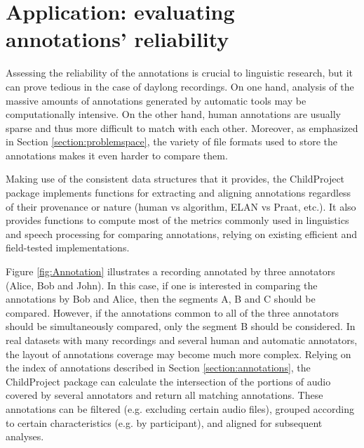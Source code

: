 \documentclass[smallextended]{svjour3}       %
\begin{document}
\section{Application: evaluating annotations' reliability}\label{section:application}

Assessing the reliability of the annotations is crucial to linguistic research, but it can prove tedious in the case of daylong recordings. On one hand, analysis of the massive amounts of annotations generated by automatic tools may be computationally intensive. On the other hand, human annotations are usually sparse and thus more difficult to match with each other. Moreover, as emphasized in Section \ref{section:problemspace}, the variety of file formats used to store the annotations makes it even harder to compare them.

Making use of the consistent data structures that it provides, the ChildProject package implements functions for extracting and aligning annotations regardless of their provenance or nature (human vs algorithm, ELAN vs Praat, etc.). It also provides functions to compute most of the metrics commonly used in linguistics and speech processing for comparing annotations, relying on existing efficient and field-tested implementations.

Figure \ref{fig:Annotation} illustrates a recording annotated by three annotators (Alice, Bob and John). In this case, if one is interested in comparing the annotations by Bob and Alice, then the segments A, B and C should be compared. However, if the annotations common to all of the three annotators should be simultaneously compared, only the segment B should be considered.
In real datasets with many recordings and several human and automatic annotators, the layout of annotations coverage may become much more complex. Relying on the index of annotations described in Section \ref{section:annotations}, the ChildProject package can calculate the intersection of the portions of audio covered by several annotators and return all matching annotations. These annotations can be filtered (e.g. excluding certain audio files), grouped according to certain characteristics (e.g. by participant), and aligned for subsequent analyses.
\end{document}
